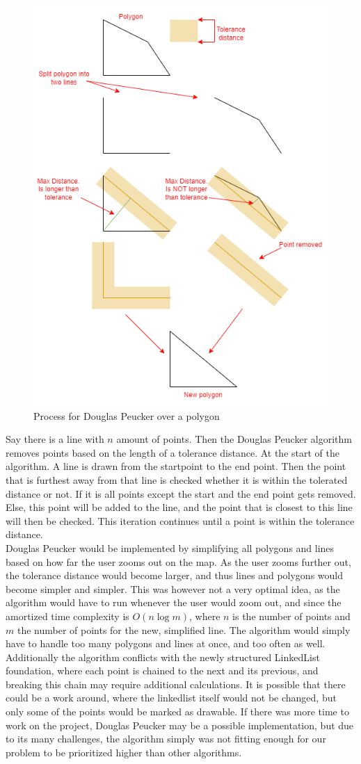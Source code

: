 \begin{figure}
\includegraphics[width=0.68\linewidth]{docs/material/Douglas Peucker.png} 
\caption{ Process for Douglas Peucker over a polygon}\label{DouglasPeucker}
\label{fig:wrapfig}
\end{figure}
Say there is a line with $n$ amount of points. Then the Douglas Peucker algorithm removes points based on the length of a tolerance distance. At the start of the algorithm. A line is drawn from the startpoint to the end point. Then the point that is furthest away from that line is checked whether it is within the tolerated distance or not. If it is all points except the start and the end point gets removed. Else, this point will be added to the line, and the point that is closest to this line will then be checked. This iteration continues until a point is within the tolerance distance.\\
Douglas Peucker would be implemented by simplifying all polygons and lines based on how far the user zooms out on the map. As the user zooms further out, the tolerance distance would become larger, and thus lines and polygons would become simpler and simpler. This was however not a very optimal idea, as the algorithm would have to run whenever the user would zoom out, and since the amortized time complexity is $O (n \log m)$\cite{Douglas/Peucker}, 
where $n$ is the number of points and $m$ the number of points for the new, simplified line. The algorithm would simply have to handle too many polygons and lines at once, and too often as well. Additionally the algorithm conflicts with the newly structured LinkedList foundation, where each point is chained to the next and its previous, and breaking this chain may require additional calculations. It is possible that there could be a work around, where the linkedlist itself would not be changed, but only some of the points would be marked as drawable. If there was more time to work on the project, Douglas Peucker may be a possible implementation, but due to its many challenges, the algorithm simply was not fitting enough for our problem to be prioritized higher than other algorithms.
\newpage
